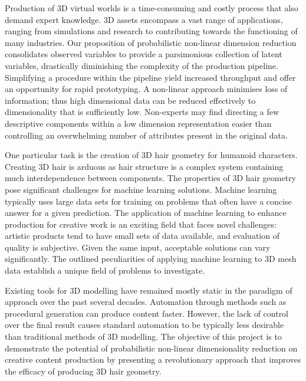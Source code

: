 \documentclass[ %
author={Dillon Keith Diep},
supervisor={Dr. Carl Henrik Ek},
degree={MEng},
title={ART-CG:},
subtitle={Assisted Real-time Content Generation of 3D Hair by Learning Manifolds},
type={Research},
year={2017} ]{dissertation}
\begin{document}
Production of 3D virtual worlds is a time-consuming and costly process that also demand expert knowledge. 3D assets encompass a vast range of applications, ranging from simulations and research to contributing towards the functioning of many industries. Our proposition of probabilistic non-linear dimension reduction consolidates observed variables to provide a parsimonious collection of latent variables, drastically diminishing the complexity of the production pipeline. Simplifying a procedure within the pipeline yield increased throughput and offer an opportunity for rapid prototyping. A non-linear approach minimises loss of information; thus high dimensional data can be reduced effectively to dimensionality that is sufficiently low. Non-experts may find directing a few descriptive components within a low dimension representation easier than controlling an overwhelming number of attributes present in the original data.

One particular task is the creation of 3D hair geometry for humanoid characters. Creating 3D hair is arduous as hair structure is a complex system containing much interdependence between components. The properties of 3D hair geometry pose significant challenges for machine learning solutions. Machine learning typically uses large data sets for training on problems that often have a concise answer for a given prediction. The application of machine learning to enhance production for creative work is an exciting field that faces novel challenges: artistic products tend to have small sets of data available, and evaluation of quality is subjective. Given the same input, acceptable solutions can vary significantly. The outlined peculiarities of applying machine learning to 3D mesh data establish a unique field of problems to investigate.

Existing tools for 3D modelling have remained mostly static in the paradigm of approach over the past several decades. Automation through methods such as procedural generation can produce content faster. However, the lack of control over the final result causes standard automation to be typically less desirable than traditional methods of 3D modelling. The objective of this project is to demonstrate the potential of probabilistic non-linear dimensionality reduction on creative content production by presenting a revolutionary approach that improves the efficacy of producing 3D hair geometry.
\end{document}
